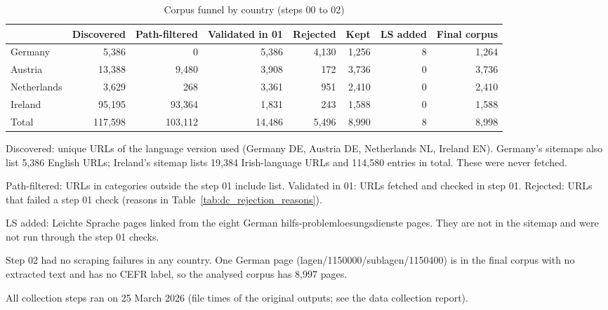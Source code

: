\begin{table}[htbp]
\centering
\small
\begin{threeparttable}
\caption{Corpus funnel by country (steps 00 to 02)}
\label{tab:dc_corpus_funnel}
\begin{tabular}{lrrrrrrr}
\hline
 & Discovered & Path-filtered & Validated in 01 & Rejected & Kept & LS added & Final corpus \\
\hline
Germany & 5,386 & 0 & 5,386 & 4,130 & 1,256 & 8 & 1,264 \\
Austria & 13,388 & 9,480 & 3,908 & 172 & 3,736 & 0 & 3,736 \\
Netherlands & 3,629 & 268 & 3,361 & 951 & 2,410 & 0 & 2,410 \\
Ireland & 95,195 & 93,364 & 1,831 & 243 & 1,588 & 0 & 1,588 \\
\hline
Total & 117,598 & 103,112 & 14,486 & 5,496 & 8,990 & 8 & 8,998 \\
\hline
\end{tabular}
\begin{tablenotes}
\footnotesize
\item Discovered: unique URLs of the language version used (Germany DE, Austria DE, Netherlands NL, Ireland EN). Germany's sitemaps also list 5,386 English URLs; Ireland's sitemap lists 19,384 Irish-language URLs and 114,580 entries in total. These were never fetched.
\item Path-filtered: URLs in categories outside the step 01 include list. Validated in 01: URLs fetched and checked in step 01. Rejected: URLs that failed a step 01 check (reasons in Table~\ref{tab:dc_rejection_reasons}).
\item LS added: Leichte Sprache pages linked from the eight German hilfs-problemloesungsdienste pages. They are not in the sitemap and were not run through the step 01 checks.
\item Step 02 had no scraping failures in any country. One German page (lagen/1150000/sublagen/1150400) is in the final corpus with no extracted text and has no CEFR label, so the analysed corpus has 8,997 pages.
\item All collection steps ran on 25 March 2026 (file times of the original outputs; see the data collection report).
\end{tablenotes}
\end{threeparttable}
\end{table}
